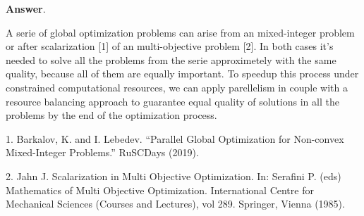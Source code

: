 \documentclass{article}%
\begin{document}
\textbf{Answer}.

A serie of global optimization problems can arise from an mixed-integer problem or
after scalarization [1] of an multi-objective problem [2]. In both cases it's needed to
solve all the problems from the serie approximetely with the same quality, because all of
them are equally important. To speedup this process under constrained computational resources,
we can apply parellelism in couple with a resource balancing approach to guarantee equal
quality of solutions in all the problems by the end of the optimization process.

1. Barkalov, K. and I. Lebedev. “Parallel Global Optimization for Non-convex Mixed-Integer Problems.” RuSCDays (2019).

2. Jahn J. Scalarization in Multi Objective Optimization. In: Serafini P. (eds) Mathematics of Multi Objective Optimization. International Centre for Mechanical Sciences (Courses and Lectures), vol 289. Springer, Vienna (1985).
\end{document}
